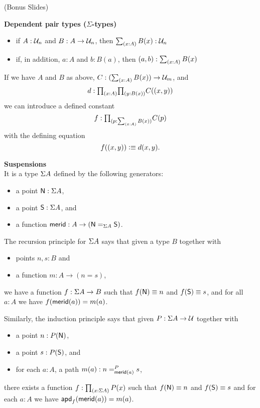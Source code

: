 \documentclass[centering]{report}
\newenvironment{slide}
    {\newpage
    \vspace*{\fill}
    }
    {
     \vspace*{\fill}
    }
\begin{document}
\begin{slide}
(Bonus Slides)
\end{slide}


\begin{slide}
\label{sigmatype}
\textbf{Dependent pair types (\texorpdfstring{$\Sigma$}{Σ}-types)}\\[2mm]

%
\begin{itemize}
\item if $A:\UU_n$ and $B: A \rightarrow \UU_n$, then $\sm{x:A}B(x) : \UU_n$
\item if, in addition, $a:A$ and $b:B(a)$, then $\tup a b:\sm{x:A}B(x)$
\end{itemize}
%
If we have $A$ and $B$ as above, $C : (\sm{x:A}B(x)) \rightarrow \UU_m$, and
\[
  d:\tprd{x:A}{y:B(x)} C(\tup x y)
\]
we can introduce a defined constant
\[
  f:\tprd{p:\sm{x:A}B(x)} C(p)
\]
with the defining equation
\[
  f(\tup x y)\defeq d(x,y).
\]
\end{slide}

\begin{slide}
\label{suspensions}
\textbf{Suspensions}\\
It is a type $\susp A$ defined by the following generators:

\begin{itemize}
\item a point $\north:\susp A$,
\item a point $\south:\susp A$, and
\item a function $\merid:A \to (\id[\susp A]\north\south)$.
\end{itemize}

The recursion principle for $\susp A$ says that given a
type $B$ together with
\begin{itemize}
\item points $n,s:B$ and
\item a function $m:A \to (n=s)$,
\end{itemize}
we have a function $f:\susp A \to B$ such that $f(\north)\jdeq n$
and $f(\south)\jdeq s$, and
for all $a:A$ we have $\ap f {\merid(a)} = m(a)$.
%
\end{slide}

\begin{slide}
Similarly, the induction principle says that given
$P:\susp A \to \type$ together with
\begin{itemize}
\item a point $n:P(\north)$,
\item a point $s:P(\south)$, and
\item for each $a:A$, a path $m(a):\dpath P{\merid(a)}ns$,
\end{itemize}
there exists a function $f:\prd{x:\susp A} P(x)$ such that
$f(\north)\jdeq n$ and $f(\south)\jdeq s$ and for each $a:A$
we have $\apd f {\merid(a)} = m(a)$.
\end{slide}
\end{document}
